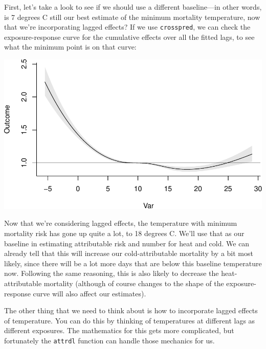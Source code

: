\documentclass[
]{book}
\newenvironment{Shaded}{\begin{snugshade}}{\end{snugshade}}
\newcommand{\DataTypeTok}[1]{\textcolor[rgb]{0.13,0.29,0.53}{#1}}
\newcommand{\DecValTok}[1]{\textcolor[rgb]{0.00,0.00,0.81}{#1}}
\newcommand{\KeywordTok}[1]{\textcolor[rgb]{0.13,0.29,0.53}{\textbf{#1}}}
\newcommand{\NormalTok}[1]{#1}
\newcommand{\OperatorTok}[1]{\textcolor[rgb]{0.81,0.36,0.00}{\textbf{#1}}}
\newcommand{\StringTok}[1]{\textcolor[rgb]{0.31,0.60,0.02}{#1}}
\begin{document}
First, let's take a look to see if we should use a different baseline---in other words, is 7 degrees C still our best estimate of the minimum mortality temperature, now that we're incorporating lagged effects? If we use \texttt{crosspred}, we can check the exposure-response curve for the cumulative effects over all the fitted lags, to see what the minimum point is on that curve:

\begin{Shaded}
\end{Shaded}

\includegraphics{adv_epi_analysis_files/figure-latex/unnamed-chunk-161-1.pdf}

Now that we're considering lagged effects, the temperature with minimum mortality risk has gone up quite a lot, to 18 degrees C. We'll use that as our baseline in estimating attributable risk and number for heat and cold. We can already tell that this will increase our cold-attributable mortality by a bit most likely, since there will be a lot more days that are below this baseline temperature now. Following the same reasoning, this is also likely to decrease the heat-attributable mortality (although of course changes to the shape of the exposure-response curve will also affect our estimates).

The other thing that we need to think about is how to incorporate lagged effects of temperature. You can do this by thinking of temperatures at different lags as different exposures. The mathematics for this gets more complicated, but fortunately the \texttt{attrdl} function can handle those mechanics for us.
\end{document}
